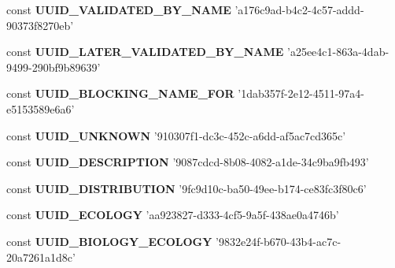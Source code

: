 \begin{DoxyCompactItemize}
\item 
\hypertarget{uuids_8php_a25992918198150b1234370fb82381be2}{const {\bfseries U\-U\-I\-D\-\_\-\-V\-A\-L\-I\-D\-A\-T\-E\-D\-\_\-\-B\-Y\-\_\-\-N\-A\-M\-E} 'a176c9ad-\/b4c2-\/4c57-\/addd-\/90373f8270eb'}\label{uuids_8php_a25992918198150b1234370fb82381be2}

\item 
\hypertarget{uuids_8php_aa3b8fe8b28b5961204863322fc3df00a}{const {\bfseries U\-U\-I\-D\-\_\-\-L\-A\-T\-E\-R\-\_\-\-V\-A\-L\-I\-D\-A\-T\-E\-D\-\_\-\-B\-Y\-\_\-\-N\-A\-M\-E} 'a25ee4c1-\/863a-\/4dab-\/9499-\/290bf9b89639'}\label{uuids_8php_aa3b8fe8b28b5961204863322fc3df00a}

\item 
\hypertarget{uuids_8php_af12e55966df3eec0e2348d23e1321e1d}{const {\bfseries U\-U\-I\-D\-\_\-\-B\-L\-O\-C\-K\-I\-N\-G\-\_\-\-N\-A\-M\-E\-\_\-\-F\-O\-R} '1dab357f-\/2e12-\/4511-\/97a4-\/e5153589e6a6'}\label{uuids_8php_af12e55966df3eec0e2348d23e1321e1d}

\item 
\hypertarget{uuids_8php_a832c50e92b7fa97209531dcc20f55f2e}{const {\bfseries U\-U\-I\-D\-\_\-\-U\-N\-K\-N\-O\-W\-N} '910307f1-\/dc3c-\/452c-\/a6dd-\/af5ac7cd365c'}\label{uuids_8php_a832c50e92b7fa97209531dcc20f55f2e}

\item 
\hypertarget{uuids_8php_ac2c1b1cbb6e55d0ef54dbbd72d09edd6}{const {\bfseries U\-U\-I\-D\-\_\-\-D\-E\-S\-C\-R\-I\-P\-T\-I\-O\-N} '9087cdcd-\/8b08-\/4082-\/a1de-\/34c9ba9fb493'}\label{uuids_8php_ac2c1b1cbb6e55d0ef54dbbd72d09edd6}

\item 
\hypertarget{uuids_8php_a1654cf950dbdcb2b2ce6999450b8f7be}{const {\bfseries U\-U\-I\-D\-\_\-\-D\-I\-S\-T\-R\-I\-B\-U\-T\-I\-O\-N} '9fc9d10c-\/ba50-\/49ee-\/b174-\/ce83fc3f80c6'}\label{uuids_8php_a1654cf950dbdcb2b2ce6999450b8f7be}

\item 
\hypertarget{uuids_8php_ac29c3e644a7c89aa2744f23024494fd4}{const {\bfseries U\-U\-I\-D\-\_\-\-E\-C\-O\-L\-O\-G\-Y} 'aa923827-\/d333-\/4cf5-\/9a5f-\/438ae0a4746b'}\label{uuids_8php_ac29c3e644a7c89aa2744f23024494fd4}

\item 
\hypertarget{uuids_8php_a27f3a5e0805f93ae65f82a4e2b1b2f07}{const {\bfseries U\-U\-I\-D\-\_\-\-B\-I\-O\-L\-O\-G\-Y\-\_\-\-E\-C\-O\-L\-O\-G\-Y} '9832e24f-\/b670-\/43b4-\/ac7c-\/20a7261a1d8c'}\label{uuids_8php_a27f3a5e0805f93ae65f82a4e2b1b2f07}


\end{DoxyCompactItemize}
